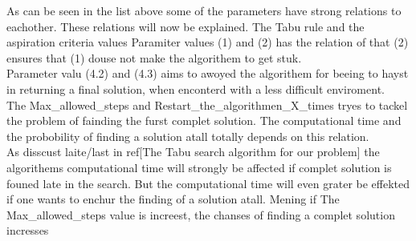 As can be seen in the list above some of the parameters have strong relations to eachother. These relations will now be explained. The Tabu rule and the aspiration criteria values 
Paramiter values (1) and (2) has the relation of that (2) ensures that (1) douse not make the algorithem to get stuk.\\
Parameter valu (4.2) and (4.3) aims to awoyed the algorithem for beeing to hayst in returning a final solution, when enconterd with a less difficult enviroment.\\
The Max\_allowed\_steps and Restart\_the\_algorithmen\_X\_times tryes to tackel the problem of fainding the furst complet solution. The computational time and the probobility of finding a solution atall totally depends on this relation.\\
As disscust laite/last in ref[The Tabu search algorithm for our problem] the algorithems computational time will strongly be affected if complet solution is founed late in the search.
But the computational time will even grater be effekted if one wants to enchur the finding of a solution atall. Mening if The Max\_allowed\_steps value is increest, the chanses of finding a complet solution incresses 
